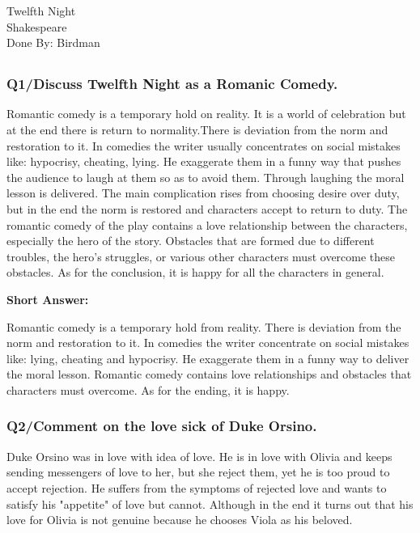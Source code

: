 \documentclass[12pt, a4paper]{article}
\begin{document}
\begin{center}
{\fonthead
\huge{Twelfth Night}\\[0.2cm]
\Large{Shakespeare}\\[0.5cm]
\large{Done By: Birdman}\\[1cm]
}
\end{center}

\subsection*{}\bigbreak

\subsubsection*{Q1/Discuss Twelfth Night as a Romanic Comedy.}
Romantic comedy is a temporary hold on reality. It is a world of 
celebration but at the end there is return to normality.There is 
deviation from
the norm and restoration to it. In comedies the writer usually 
concentrates on social mistakes like: hypocrisy, cheating, lying. He
exaggerate them in a funny way that pushes the audience to laugh at them so as to avoid them. 
Through laughing the moral lesson is delivered. The main complication
rises from choosing desire over duty, but in the end the norm is
restored and characters accept to return to duty. The romantic comedy
of the play contains a love relationship between the characters, 
especially the hero of the story. Obstacles that are formed due to 
different troubles, the hero's struggles, or various other characters
must overcome these obstacles. As for the conclusion, it is happy for 
all the characters in general.\medbreak

\textbf{Short Answer:}\medbreak

Romantic comedy is a temporary hold from reality. There is deviation from
the norm and restoration to it. In comedies the writer concentrate on
social mistakes like: lying, cheating and hypocrisy. He exaggerate them
in a funny way to deliver the moral lesson. Romantic comedy contains
love relationships and obstacles that characters must overcome. As
for the ending, it is happy.

\subsubsection*{Q2/Comment on the love sick of Duke Orsino.}

Duke Orsino was in love with idea of love. He is in love with Olivia
and keeps sending messengers of love to her, but she reject them, yet he 
is too proud to accept rejection. He suffers from the symptoms of 
rejected love and wants to satisfy his "appetite" of love but cannot.
Although in the end it turns out that his love for Olivia is not genuine
because he chooses Viola as his beloved.
\end{document}
